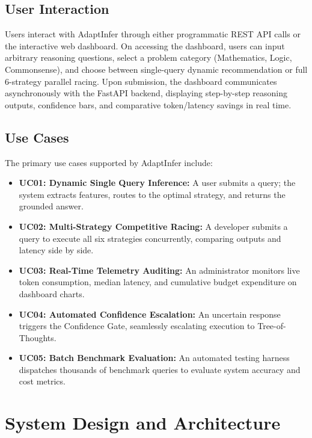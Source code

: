 \documentclass[12pt,a4paper]{report}
\begin{document}
\section{User Interaction}
\label{sec:user_interaction}
Users interact with AdaptInfer through either programmatic REST API calls or the interactive web dashboard. On accessing the dashboard, users can input arbitrary reasoning questions, select a problem category (Mathematics, Logic, Commonsense), and choose between single-query dynamic recommendation or full 6-strategy parallel racing. Upon submission, the dashboard communicates asynchronously with the FastAPI backend, displaying step-by-step reasoning outputs, confidence bars, and comparative token/latency savings in real time.

\section{Use Cases}
\label{sec:use_cases}
The primary use cases supported by AdaptInfer include:
\begin{itemize}[leftmargin=*]
    \item \textbf{UC01: Dynamic Single Query Inference:} A user submits a query; the system extracts features, routes to the optimal strategy, and returns the grounded answer.
    \item \textbf{UC02: Multi-Strategy Competitive Racing:} A developer submits a query to execute all six strategies concurrently, comparing outputs and latency side by side.
    \item \textbf{UC03: Real-Time Telemetry Auditing:} An administrator monitors live token consumption, median latency, and cumulative budget expenditure on dashboard charts.
    \item \textbf{UC04: Automated Confidence Escalation:} An uncertain response triggers the Confidence Gate, seamlessly escalating execution to Tree-of-Thoughts.
    \item \textbf{UC05: Batch Benchmark Evaluation:} An automated testing harness dispatches thousands of benchmark queries to evaluate system accuracy and cost metrics.
\end{itemize}

\chapter{System Design and Architecture}
\label{ch:system_design}
\end{document}
